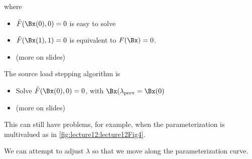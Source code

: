 where 

\begin{itemize}
\item \( \tilde{F}(\Bx(0), 0) = 0 \) is easy to solve
\item \( \tilde{F}(\Bx(1), 1) = 0 \) is equivalent to \( F(\Bx) = 0 \).
\item (more on slides)
\end{itemize}

The source load stepping algorithm is

\begin{itemize}
\item Solve \(\tilde{F}(\Bx(0), 0) = 0 \), with \( \Bx(\lambda_{\text{prev}} = \Bx(0) \)
\item (more on slides)
\end{itemize}

This can still have problems, for example, when the parameterization is multivalued as in \cref{fig:lecture12:lecture12Fig4}.


We can attempt to adjust \( \lambda \) so that we move along the parameterization curve.

